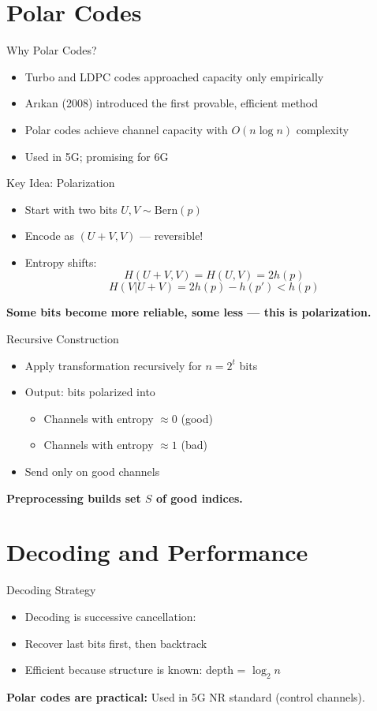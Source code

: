 \documentclass[11pt]{beamer}
\begin{document}
\section{Polar Codes}
\begin{frame}{Why Polar Codes?}
\begin{itemize}
    \item Turbo and LDPC codes approached capacity only empirically
    \item Arıkan (2008) introduced the first provable, efficient method
    \item Polar codes achieve channel capacity with $O(n \log n)$ complexity
    \item Used in 5G; promising for 6G
\end{itemize}
\end{frame}

\begin{frame}{Key Idea: Polarization}
\begin{itemize}
    \item Start with two bits $U, V \sim \text{Bern}(p)$
    \item Encode as $(U + V, V)$ — reversible!
    \item Entropy shifts:
    \[
    H(U+V, V) = H(U,V) = 2h(p)
    \]
    \[
    H(V | U + V) = 2h(p) - h(p') < h(p)
    \]
\end{itemize}
\pause
\textbf{Some bits become more reliable, some less — this is polarization.}
\end{frame}

\begin{frame}{Recursive Construction}
\begin{itemize}
    \item Apply transformation recursively for $n = 2^t$ bits
    \item Output: bits polarized into
    \begin{itemize}
        \item Channels with entropy $\approx 0$ (good)
        \item Channels with entropy $\approx 1$ (bad)
    \end{itemize}
    \item Send only on good channels
\end{itemize}
\pause
\textbf{Preprocessing builds set $S$ of good indices.}
\end{frame}

\section{Decoding and Performance}
\begin{frame}{Decoding Strategy}
\begin{itemize}
    \item Decoding is successive cancellation:
    \item Recover last bits first, then backtrack
    \item Efficient because structure is known: depth = $\log_2 n$
\end{itemize}
\pause
\textbf{Polar codes are practical:} Used in 5G NR standard (control channels).
\end{frame}
\end{document}
